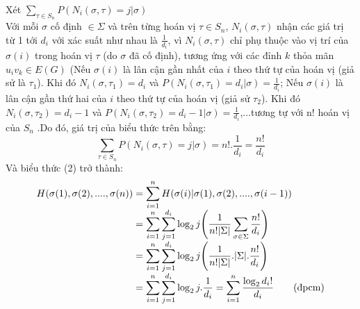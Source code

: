 \documentclass[a4paper]{report}
\begin{document}
Xét $\displaystyle \sum_{\tau \in S_{n}}P(N_{i}(\sigma,\tau)=j | \sigma)$ \\
Với mỗi $\sigma$ cố định $\in \Sigma$ và trên từng hoán vị $\tau \in S_{n}$,  $N_{i}(\sigma,\tau)$ nhận các giá trị từ 1 tới $d_{i}$ với xác suất như nhau là $\frac{1}{d_{i}}$, vì $N_{i}(\sigma,\tau)$ chỉ phụ thuộc vào vị trí của $\sigma(i)$ trong hoán vị $\tau$ (do $\sigma$ đã cố định), tương ứng với các đỉnh $k$ thỏa mãn $u_{i}v_{k} \in E(G)$ (Nếu  $\sigma(i)$ là lân cận gần nhất của $i$ theo thứ tự của hoán vị (giả sử là $\tau_{1}$).  Khi đó $N_{i}(\sigma,\tau_{1}) = d_{i}$ và $P(N_{i}(\sigma,\tau_{1})=d_{i} | \sigma)=\frac{1}{d_{i}}$; Nếu  $\sigma(i)$ là lân cận gần thứ hai của $i$ theo thứ tự của hoán vị (giả sử $\tau_{2}$). Khi đó $N_{i}(\sigma,\tau_{2}) = d_{i}-1$ và $P(N_{i}(\sigma,\tau_{2})=d_{i}-1 | \sigma)=\frac{1}{d_{i}}$,...tương tự với n! hoán vị của $S_{n}$ .Do đó, giá trị của biểu thức trên bằng:
\begin{equation*}
    \displaystyle \sum_{\tau \in S_{n}}P(N_{i}(\sigma,\tau)=j | \sigma)=n!.\frac{1}{d_{i}} = \frac{n!}{d_{i}}
\end{equation*}
Và biểu thức (2) trở thành:
\begin{equation*}
\begin{array}{l@{}l}
H(\sigma (1), \sigma (2), ....  ,\sigma (n)) 
&{}= \displaystyle \sum_{i=1}^{n}H(\sigma (i)| \sigma (1), \sigma (2), ....  ,\sigma (i-1)) \\
&{} =  \displaystyle \sum_{i=1}^{n}\displaystyle \sum_{j=1}^{d_{i}}\log_{2}j \Bigg(\frac{1}{n!|\Sigma|}\displaystyle \sum_{\sigma \in \Sigma}\frac{n!}{d_{i}} \Bigg) \\
 &{}= \displaystyle \sum_{i=1}^{n}\displaystyle \sum_{j=1}^{d_{i}}\log_{2}j \Bigg(\frac{1}{n!|\Sigma|}.|\Sigma|.\frac{n!}{d_{i}} \Bigg) \\
 &{}= \displaystyle \sum_{i=1}^{n}\displaystyle \sum_{j=1}^{d_{i}}\log_{2}j.\frac{1}{d_{i}} =\displaystyle \sum_{i=1}^{n} \frac{\log_{2}d_{i}!}{d_{i}}  \;\;\;\;\;\; \textrm{              (đpcm)}
\end{array}
\end{equation*}






%
%
%
\end{document}
